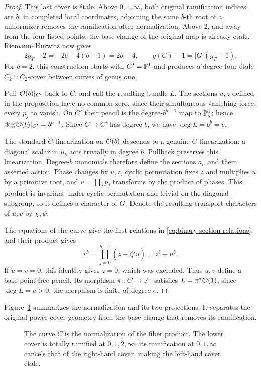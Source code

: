 \begin{proof}
This last cover is \'etale.  Above \(0,1,\infty\), both original
ramification indices are \(b\); in completed local coordinates,
adjoining the same \(b\)-th root of a uniformizer removes the
ramification after normalization.  Above \(2\), and away from
the four listed points, the base change of the original map is
already \'etale.  Riemann--Hurwitz now gives
\[
 2g_T-2=-2b+4(b-1)=2b-4,\qquad
 g(C)-1=|G|(g_T-1).
\]
For \(b=2\), this construction starts with \(C'=\mathbb P^1\) and
produces a degree-four \'etale \(C_2\times C_2\)-cover between
curves of genus one.

Pull \(\mathcal O(b)|_{C'}\) back to \(C\), and call the resulting
bundle \(L\).  The sections \(u,z\) defined in the proposition
have no common zero, since their simultaneous vanishing forces
every \(p_j\) to vanish.  On \(C'\) their pencil is the
degree-\(b^{b-1}\) map to \(\mathbb P^1_s\); hence
\(\deg\mathcal O(b)|_{C'}=b^{b-1}\).  Since \(C\to C'\) has degree
\(b\), we have \(\deg L=b^b=e\).

The standard \(\widetilde G\)-linearization on \(\mathcal O(b)\)
descends to a genuine \(G\)-linearization: a diagonal scalar
in \(\mu_b\) acts trivially in degree \(b\).  Pullback preserves
this linearization.  Degree-\(b\) monomials therefore define
the sections \(a_\alpha\) and their asserted action.
Phase changes fix \(u,z\), cyclic permutation fixes \(z\)
and multiplies \(u\) by a primitive root, and \(v=\prod_jp_j\)
transforms by the product of phases.  This product is invariant
under cyclic permutation and trivial on the diagonal subgroup,
so it defines a character of \(G\).  Denote the resulting
transport characters of \(u,v\) by \(\chi,\psi\).

The equations of the curve give the first relations in
\eqref{eq:binary-section-relations}, and their product gives
\[
 v^b=\prod_{j=0}^{b-1}(z-\zeta^ju)=z^b-u^b.
\]
If \(u=v=0\), this identity gives \(z=0\), which was excluded.
Thus \(u,v\) define a base-point-free pencil.  Its morphism
\(\pi:C\to\mathbb P^1\) satisfies \(L=\pi^*\mathcal O(1)\); since
\(\deg L=e>0\), the morphism is finite of degree \(e\).
\end{proof}

Figure~\ref{fig:curve-covers} summarizes the normalization and its two
projections. It separates the original power-cover geometry from the
base change that removes its ramification.

\begin{figure}[!htbp]
\centering
{}
\caption{The curve $C$ is the normalization of the fiber product.
The lower cover is totally ramified at $0,1,2,\infty$; its ramification
at $0,1,\infty$ cancels that of the right-hand cover, making the
left-hand cover \'etale.}
\label{fig:curve-covers}
\end{figure}
\FloatBarrier


